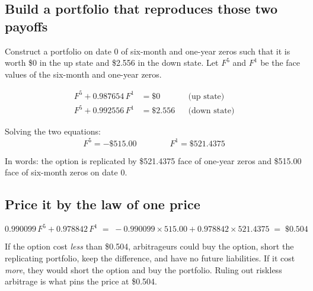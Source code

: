 \subsection{Build a portfolio that reproduces those two payoffs}
Construct a portfolio on date 0 of six-month and one-year zeros such that it is worth \$0 in the
up state and \$2.556 in the down state. Let $F^5$ and $F^1$ be the face values of the six-month
and one-year zeros.

\begin{mrfmlbox}
\begin{align*}
F^5 + 0.987654\,F^1 &= \$0 && \text{(up state)}\\
F^5 + 0.992556\,F^1 &= \$2.556 && \text{(down state)}
\end{align*}
\end{mrfmlbox}

Solving the two equations:
\[ F^5 = -\$515.00 \qquad\qquad F^1 = \$521.4375 \]

In words: the option is replicated by  \$521.4375 face of one-year zeros and
 \$515.00 face of six-month zeros on date 0.

\subsection{Price it by the law of one price}
\[ 0.990099\,F^5 + 0.978842\,F^1 \;=\; -0.990099 \times 515.00 + 0.978842 \times 521.4375
   \;=\; \mathbf{\$0.504} \]

\begin{mrtrapbox}[title={What enforces the price}]
If the option cost \textit{less} than \$0.504, arbitrageurs could buy the option, short the
replicating portfolio, keep the difference, and have no future liabilities. If it cost
\textit{more}, they would short the option and buy the portfolio. Ruling out riskless arbitrage
is what pins the price at \$0.504.
\end{mrtrapbox}


